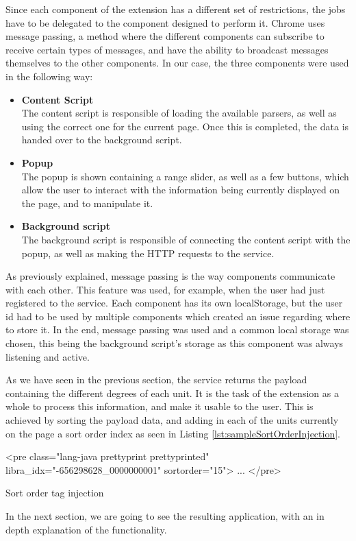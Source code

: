Since each component of the extension has a different set of restrictions, the jobs have to be delegated to the component designed to perform it. Chrome uses message passing, a method where the different components can subscribe to receive certain types of messages, and have the ability to broadcast messages themselves to the other components. In our case, the three components were used in the following way:
\begin{itemize}
\item \textbf{Content Script}\\
The content script is responsible of loading the available parsers, as well as using the correct one for the current page. Once this is completed, the data is handed over to the background script.
\item \textbf{Popup}\\
The popup is shown containing a range slider, as well as a few buttons, which allow the user to interact with the information being currently displayed on the page, and to manipulate it. 
\item \textbf{Background script}\\
The background script is responsible of connecting the content script with the popup, as well as making the HTTP requests to the service. 
\end{itemize}

As previously explained, message passing is the way components communicate with each other. This feature was used, for example, when the user had just registered to the service. Each component has its own localStorage, but the user id had to be used by multiple components which created an issue regarding where to store it. In the end, message passing was used and a common local storage was chosen, this being the background script's storage as this component was always listening and active.






As we have seen in the previous section, the service returns the payload containing the different degrees of each unit. It is the task of the extension as a whole to process this information, and make it usable to the user. This is achieved by sorting the payload data, and adding in each of the units currently on the page a sort order index as seen in Listing \ref{lst:sampleSortOrderInjection}.
\begin{listing}
\centering
\begin{htmlcode}
<pre class="lang-java prettyprint prettyprinted" libra_idx="-656298628_0000000001" sortorder="15">
	...
</pre>	
\end{htmlcode}
\caption{Sort order tag injection}
\label{lst:sampleSortOrderInjection}
\end{listing}
In the next section, we are going to see the resulting application, with an in depth explanation of the functionality.
